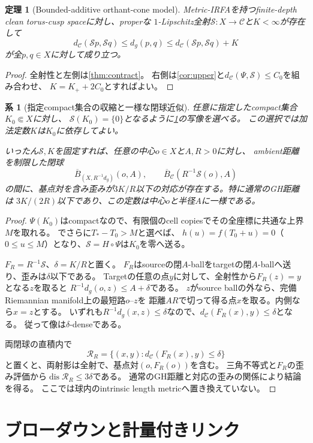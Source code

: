 \documentclass[11pt,a4paper]{ltjsarticle}
\newcommand{\cC}{\mathcal C}
\newcommand{\cS}{\mathcal S}
\newcommand{\ov}{\overline}
\theoremstyle{plain}
\newtheorem{theorem}{定理}[section]
\newtheorem{corollary}[corollary]{系}
\theoremstyle{definition}
\theoremstyle{remark}
\begin{document}
\begin{theorem}[Bounded-additive orthant-cone model]
\label{thm:rough}
Metric-IRFAを持つfinite-depth clean torus-cusp spaceに対し、properな
$1$-Lipschitz全射$\cS:X\to\cC$と$K<\infty$が存在して
\[
 \boxed{
 d_\cC(\cS p,\cS q)\le d_g(p,q)
 \le d_\cC(\cS p,\cS q)+K}
\]
が全$p,q\in X$に対して成り立つ。
\end{theorem}
\begin{proof}
全射性と左側は\cref{thm:contract}。
右側は\cref{cor:upper}と$d_\cC(\Psi,\cS)\le C_0$を組み合わせ、
$K=K_++2C_0$とすればよい。
\end{proof}


\begin{corollary}[指定compact集合の収縮と一様な閉球近似]
\label{cor:based-ball-approximation}
任意に指定したcompact集合$K_0\Subset X$に対し、
$\cS(K_0)=\{0\}$となるように\cref{thm:rough}の写像を選べる。
この選択では加法定数$K$は$K_0$に依存してよい。

いったん$\cS,K$を固定すれば、任意の中心$o\in X$と$A,R>0$に対し、
ambient距離を制限した閉球
\[
 \ov B_{(X,R^{-1}d_g)}(o,A),\qquad
 \ov B_\cC(R^{-1}\cS(o),A)
\]
の間に、基点対を含み歪みが$3K/R$以下の対応が存在する。特に通常のGH距離は
$3K/(2R)$以下であり、この定数は中心$o$と半径$A$に一様である。
\end{corollary}
\begin{proof}
$\Psi(K_0)$はcompactなので、有限個のcell copiesでその全座標に共通な上界$M$を取れる。
でさらに$T_*-T_0>M$と選べば、
$h(u)=f(T_0+u)=0$（$0\le u\le M$）となり、$\cS=H\circ\Psi$は$K_0$を零へ送る。

$F_R=R^{-1}\cS$、$\delta=K/R$と置く。
$F_R$はsourceの閉$A$-ballをtargetの閉$A$-ballへ送り、歪みは$\delta$以下である。
Targetの任意の点$y$に対して、全射性から$F_R(z)=y$となる$z$を取ると
$R^{-1}d_g(o,z)\le A+\delta$である。
$z$がsource ballの外なら、完備Riemannian manifold上の最短路$o$--$z$を
距離$AR$で切って得る点$x$を取る。内側なら$x=z$とする。
いずれも$R^{-1}d_g(x,z)\le\delta$なので、$d_\cC(F_R(x),y)\le\delta$となる。
従って像は$\delta$-denseである。

両閉球の直積内で
\[
 \mathcal R_R=\{(x,y):d_\cC(F_R(x),y)\le\delta\}
\]
と置くと、両射影は全射で、基点対$(o,F_R(o))$を含む。
三角不等式と$F_R$の歪み評価から$\operatorname{dis}\mathcal R_R\le3\delta$である。
通常のGH距離と対応の歪みの関係により結論を得る。
ここでは球内のintrinsic length metricへ置き換えていない。
\end{proof}

\section{ブローダウンと計量付きリンク}
\label{sec:blowdown}
\end{document}
